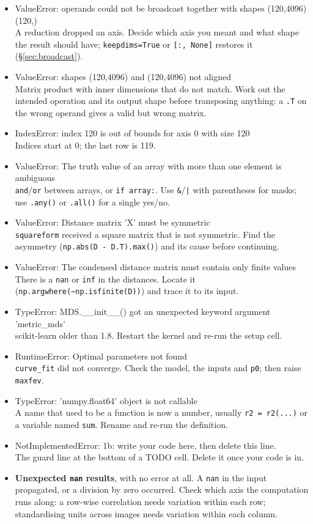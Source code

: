 \documentclass[11pt]{article}
\begin{document}
\newcommand{\err}[1]{{\small\ttfamily #1}\\}
\begin{itemize}
\item \err{ValueError: operands could not be broadcast together with shapes (120,4096) (120,)}
      A reduction dropped an axis. Decide which axis you meant and what shape the result
      should have; \texttt{keepdims=True} or \texttt{[:, None]} restores it (\S\ref{sec:broadcast}).
\item \err{ValueError: shapes (120,4096) and (120,4096) not aligned}
      Matrix product with inner dimensions that do not match. Work out the intended
      operation and its output shape before transposing anything: a \texttt{.T} on the
      wrong operand gives a valid but wrong matrix.
\item \err{IndexError: index 120 is out of bounds for axis 0 with size 120}
      Indices start at 0; the last row is 119.
\item \err{ValueError: The truth value of an array with more than one element is ambiguous}
      \texttt{and}/\texttt{or} between arrays, or \texttt{if array:}. Use \texttt{\&}/\texttt{|}
      with parentheses for masks; use \texttt{.any()} or \texttt{.all()} for a single yes/no.
\item \err{ValueError: Distance matrix 'X' must be symmetric}
      \texttt{squareform} received a square matrix that is not symmetric. Find the
      asymmetry (\texttt{np.abs(D - D.T).max()}) and its cause before continuing.
\item \err{ValueError: The condensed distance matrix must contain only finite values}
      There is a \texttt{nan} or \texttt{inf} in the distances. Locate it
      (\texttt{np.argwhere(\textasciitilde np.isfinite(D))}) and trace it to its input.
\item \err{TypeError: MDS.\_\_init\_\_() got an unexpected keyword argument 'metric\_mds'}
      scikit-learn older than 1.8. Restart the kernel and re-run the setup cell.
\item \err{RuntimeError: Optimal parameters not found}
      \texttt{curve\_fit} did not converge. Check the model, the inputs and \texttt{p0};
      then raise \texttt{maxfev}.
\item \err{TypeError: 'numpy.float64' object is not callable}
      A name that used to be a function is now a number, usually \texttt{r2 = r2(...)}
      or a variable named \texttt{sum}. Rename and re-run the definition.
\item \err{NotImplementedError: 1b: write your code here, then delete this line.}
      The guard line at the bottom of a TODO cell. Delete it once your code is in.
\item \textbf{Unexpected \texttt{nan} results}, with no error at all.
      A \texttt{nan} in the input propagated, or a division by zero occurred. Check which
      axis the computation runs along: a row-wise correlation needs variation within each
      row; standardising units across images needs variation within each column.
\end{itemize}
\end{document}
